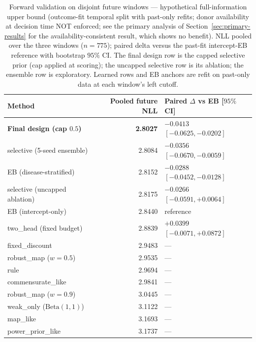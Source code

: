 \documentclass[11pt]{article}
\begin{document}
\begin{table}[htbp]
\centering
\caption{Forward validation on disjoint future windows --- hypothetical
full-information upper bound (outcome-fit temporal split with past-only
refits; donor availability at decision time NOT enforced; see the primary
analysis of Section~\ref{sec:primary-results} for the availability-consistent
result, which shows no benefit). NLL pooled over the three windows
($n=775$); paired delta versus the past-fit intercept-EB reference with
bootstrap $95\%$ CI. The final design row is the capped selective prior
(cap applied at scoring); the uncapped selective row is its ablation; the
ensemble row is exploratory. Learned rows and EB
anchors are refit on past-only data at each window's left cutoff.}
\label{tab:forward}
\begin{tabular}{lrl}
\toprule
Method & Pooled future NLL & Paired $\Delta$ vs EB [$95\%$ CI] \\
\midrule
\textbf{Final design (cap $0.5$)} & \textbf{2.8027} &
$\mathbf{-0.0413}$ $[-0.0625,-0.0202]$ \\
selective (5-seed ensemble) & 2.8084 & $-0.0356$ $[-0.0670,-0.0059]$ \\
EB (disease-stratified) & 2.8152 & $-0.0288$ $[-0.0452,-0.0128]$ \\
selective (uncapped ablation) & 2.8175 & $-0.0266$ $[-0.0591,+0.0064]$ \\
EB (intercept-only) & 2.8440 & reference \\
two\_head (fixed budget) & 2.8839 & $+0.0399$ $[-0.0071,+0.0872]$ \\
fixed\_discount & 2.9483 & --- \\
robust\_map ($w{=}0.5$) & 2.9535 & --- \\
rule & 2.9694 & --- \\
commensurate\_like & 2.9841 & --- \\
robust\_map ($w{=}0.9$) & 3.0445 & --- \\
weak\_only ($\mathrm{Beta}(1,1)$) & 3.1122 & --- \\
map\_like & 3.1693 & --- \\
power\_prior\_like & 3.1737 & --- \\
\bottomrule
\end{tabular}
\end{table}
\end{document}
